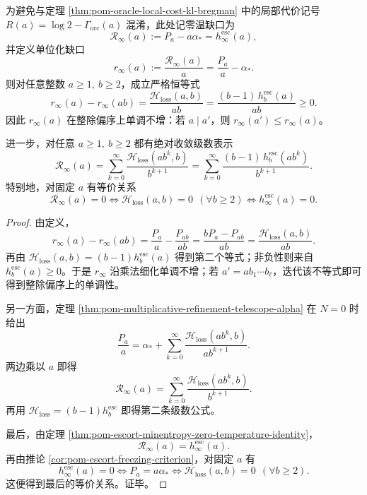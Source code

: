 \begin{theorem}[零温缺口的除性单调律与乘法射线求和公式]\label{thm:pom-zero-temperature-gap-divisibility-ray-sum}
为避免与定理 \ref{thm:pom-oracle-local-cost-kl-bregman} 中的局部代价记号 \(R(a)=\log 2-\Gamma_{\mathrm{orc}}(a)\) 混淆，此处记零温缺口为
\[
\mathcal{R}_{\infty}(a):=P_a-a\alpha_\ast
=
h_\infty^{\mathrm{esc}}(a),
\]
并定义单位化缺口
\[
r_\infty(a):=\frac{\mathcal{R}_{\infty}(a)}{a}
=
\frac{P_a}{a}-\alpha_\ast.
\]
则对任意整数 \(a\ge 1,\ b\ge 2\)，成立严格恒等式
\[
\boxed{\;
r_\infty(a)-r_\infty(ab)
=
\frac{\mathcal{H}_{\mathrm{loss}}(a,b)}{ab}
=
\frac{(b-1)\,h_b^{\mathrm{esc}}(a)}{ab}\ge 0.\;}
\]
因此 \(r_\infty(a)\) 在整除偏序上单调不增：若 \(a\mid a'\)，则 \(r_\infty(a')\le r_\infty(a)\)。

进一步，对任意 \(a\ge 1,\ b\ge 2\) 都有绝对收敛级数表示
\[
\boxed{\;
\mathcal{R}_{\infty}(a)
=
\sum_{k=0}^{\infty}\frac{\mathcal{H}_{\mathrm{loss}}(ab^k,b)}{b^{k+1}}
=
\sum_{k=0}^{\infty}\frac{(b-1)\,h_b^{\mathrm{esc}}(ab^k)}{b^{k+1}}.\;}
\]
特别地，对固定 \(a\) 有等价关系
\[
\boxed{\;
\mathcal{R}_{\infty}(a)=0
\iff
\mathcal{H}_{\mathrm{loss}}(a,b)=0\ \ (\forall b\ge 2)
\iff
h_\infty^{\mathrm{esc}}(a)=0.\;}
\]
\end{theorem}
\begin{proof}
由定义，
\[
r_\infty(a)-r_\infty(ab)
=
\frac{P_a}{a}-\frac{P_{ab}}{ab}
=
\frac{bP_a-P_{ab}}{ab}
=
\frac{\mathcal{H}_{\mathrm{loss}}(a,b)}{ab}.
\]
再由 \(\mathcal{H}_{\mathrm{loss}}(a,b)=(b-1)h_b^{\mathrm{esc}}(a)\) 得到第二个等式；非负性则来自 \(h_b^{\mathrm{esc}}(a)\ge 0\)。于是 \(r_\infty\) 沿乘法细化单调不增；若 \(a'=ab_1\cdots b_\ell\)，迭代该不等式即可得到整除偏序上的单调性。

另一方面，定理 \ref{thm:pom-multiplicative-refinement-telescope-alpha} 在 \(N=0\) 时给出
\[
\frac{P_a}{a}
=
\alpha_\ast+\sum_{k=0}^{\infty}\frac{\mathcal{H}_{\mathrm{loss}}(ab^k,b)}{ab^{k+1}}.
\]
两边乘以 \(a\) 即得
\[
\mathcal{R}_{\infty}(a)
=
\sum_{k=0}^{\infty}\frac{\mathcal{H}_{\mathrm{loss}}(ab^k,b)}{b^{k+1}}.
\]
再用 \(\mathcal{H}_{\mathrm{loss}}=(b-1)h_b^{\mathrm{esc}}\) 即得第二条级数公式。

最后，由定理 \ref{thm:pom-escort-minentropy-zero-temperature-identity}，
\[
\mathcal{R}_{\infty}(a)=h_\infty^{\mathrm{esc}}(a).
\]
再由推论 \ref{cor:pom-escort-freezing-criterion}，对固定 \(a\) 有
\[
h_\infty^{\mathrm{esc}}(a)=0
\iff
P_a=a\alpha_\ast
\iff
\mathcal{H}_{\mathrm{loss}}(a,b)=0\ \ (\forall b\ge 2).
\]
这便得到最后的等价关系。证毕。
\end{proof}

